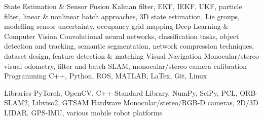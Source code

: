 

\begin{cvskills}

  \cvskill
    {State Estimation \& Sensor Fusion}%
    {Kalman filter, EKF, IEKF, UKF, particle filter, linear \& nonlinear batch approaches, 3D state estimation, Lie groups, modelling sensor uncertainty, occupancy grid mapping} %
  \cvskill
	{Deep Learning \& Computer Vision} %
	{Convolutional neural networks, classification tasks, object detection and tracking, semantic segmentation, network compression techniques, dataset design, feature detection \& matching} %
  \cvskill
	{Visual Navigation} %
	{Monocular/stereo visual odometry, filter and batch SLAM, monocular/stereo camera calibration} %
  \cvskill
    {Programming} %
    {C++, Python, ROS, MATLAB, LaTex, Git, Linux} %
    
  \cvskill
    {Libraries} %
    {PyTorch, OpenCV, C++ Standard Library, NumPy, SciPy, PCL, ORB-SLAM2, Libviso2, GTSAM} %
  \cvskill
    {Hardware} %
    {Monocular/stereo/RGB-D cameras, 2D/3D LIDAR, GPS-IMU, various mobile robot platforms} %

\end{cvskills}
